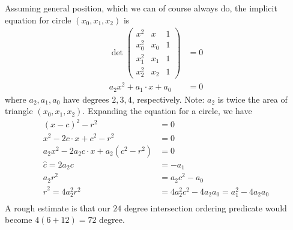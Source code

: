 \documentclass[11pt]{article}
\begin{document}
Assuming general position, which we can of course always do, the implicit equation for circle $(x_0,x_1,x_2)$ is
\begin{align*}
\det \left(\begin{array}{ccc}
  x^2 & x & 1 \\
  x_0^2 & x_0 & 1 \\
  x_1^2 & x_1 & 1 \\
  x_2^2 & x_2 & 1
\end{array} \right ) &= 0 \\
a_2 x^2 + a_1 \cdot x + a_0 &= 0
\end{align*}
where $a_2, a_1, a_0$ have degrees $2, 3, 4$, respectively.  Note: $a_2$ is twice the area of triangle $(x_0,x_1,x_2)$.  Expanding the equation for
a circle, we have
\begin{align*}
(x - c)^2 - r^2 &= 0 \\
x^2 - 2c \cdot x + c^2 - r^2 &= 0 \\
a_2 x^2 - 2a_2 c \cdot x + a_2 (c^2 - r^2) &= 0 \\
\hat{c} = 2 a_2 c &= -a_1 \\
a_2 r^2 &= a_2 c^2 - a_0 \\
\hat{r}^2 = 4 a_2^2 r^2 &= 4 a_2^2 c^2 - 4 a_2 a_0 = a_1^2 - 4 a_2 a_0 \\
\end{align*}
A rough estimate is that our $24$ degree intersection ordering predicate would become $4(6+12) = 72$ degree.
\end{document}
